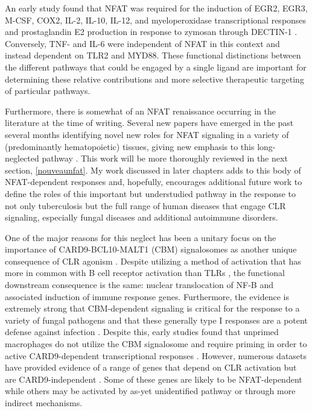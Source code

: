 An early study found that NFAT was required for the induction of EGR2, EGR3, M-CSF, COX2, IL-2, IL-10, IL-12, and myeloperoxidase transcriptional responses and prostaglandin E2 production in response to zymosan through DECTIN-1 \citep{Goodridge2007}. Conversely, TNF-\textalpha{} and IL-6 were independent of NFAT in this context and instead dependent on TLR2 and MYD88. These functional distinctions between the different pathways that could be engaged by a single ligand are important for determining these relative contributions and more selective therapeutic targeting of particular pathways.

Furthermore, there is somewhat of an NFAT renaissance occurring in the literature at the time of writing. Several new papers have emerged in the past several months identifying novel new roles for NFAT signaling in a variety of (predominantly hematopoietic) tissues, giving new emphasis to this long-neglected pathway \citep{Deerhake2021, Poli2022, Peuker2022}. This work will be more thoroughly reviewed in the next section, \autoref{nouveaunfat}. My work discussed in later chapters adds to this body of NFAT-dependent responses and, hopefully, encourages additional future work to define the roles of this important but understudied pathway in the response to not only tuberculosis but the full range of human diseases that engage CLR signaling, especially fungal diseases and additional autoimmune disorders.

One of the major reasons for this neglect has been a unitary focus on the importance of CARD9-BCL10-MALT1 (CBM) signalosomes as another unique consequence of CLR agonism \citep{Drummond2011, Drummond2016, Drummond2018, Marakalala2010, Marakalala2017}. Despite utilizing a method of activation that has more in common with B cell receptor activation than TLRs \citep{Monroe2006}, the functional downstream consequence is the same: nuclear translocation of NF-\textkappa B and associated induction of immune response genes. Furthermore, the evidence is extremely strong that CBM-dependent signaling is critical for the response to a variety of fungal pathogens and that these generally type I responses are a potent defense against infection \citep{Drummond2018, Hardison2012, Willment2008}. Despite this, early studies found that unprimed macrophages do not utilize the CBM signalosome and require priming in order to active CARD9-dependent transcriptional responses \citep{Goodridge2009}. However, numerous datasets have provided evidence of a range of genes that depend on CLR activation but are CARD9-independent \citep{Deerhake2021}. Some of these genes are likely to be NFAT-dependent while others may be activated by as-yet unidentified pathway or through more indirect mechanisms. 

